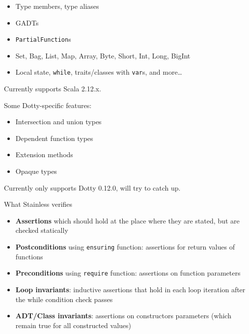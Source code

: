 \documentclass[
  ignorenonframetext,
]{beamer}
\providecommand{\tightlist}{%
  \setlength{\itemsep}{0pt}\setlength{\parskip}{0pt}}
\begin{document}
\begin{frame}[fragile]

\begin{itemize}
\tightlist
\item
  Type members, type aliases
\item
  GADTs
\item
  \texttt{PartialFunction}s
\item
  Set, Bag, List, Map, Array, Byte, Short, Int, Long, BigInt
\item
  Local state, \texttt{while}, traits/classes with \texttt{var}s, and
  more\ldots{}
\end{itemize}

Currently supports Scala 2.12.x.

\end{frame}

\begin{frame}

Some Dotty-specific features:

\begin{itemize}
\tightlist
\item
  Intersection and union types
\item
  Dependent function types
\item
  Extension methods
\item
  Opaque types
\end{itemize}

Currently only supports Dotty 0.12.0, will try to catch up.

\end{frame}

\begin{frame}[fragile]{What Stainless verifies}
\protect\hypertarget{what-stainless-verifies}{}

\begin{itemize}
\tightlist
\item
  \textbf{Assertions} which should hold at the place where they are
  stated, but are checked statically
\item
  \textbf{Postconditions} using \texttt{ensuring} function: assertions
  for return values of functions
\item
  \textbf{Preconditions} using \texttt{require} function: assertions on
  function parameters
\item
  \textbf{Loop invariants}: inductive assertions that hold in each loop
  iteration after the while condition check passes
\item
  \textbf{ADT/Class invariants}: assertions on constructors parameters
  (which remain true for all constructed values)
\end{itemize}

\end{frame}
\end{document}
